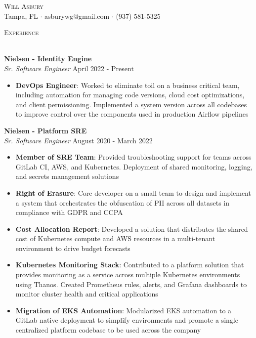 \documentclass[a4paper]{article}
\newcommand{\lineunder} {
    \vspace*{-8pt} \\
    \hspace*{-18pt} \hrulefill \\
}
\newcommand{\header} [1] {
    {\hspace*{-18pt}\vspace*{6pt} \textsc{#1}}
    \vspace*{-6pt} \lineunder
}
\begin{document}
\vspace*{-40pt}

\vspace*{-10pt}
\begin{center}
	{\Huge \scshape {Will Asbury}}\\
	Tampa, FL $\cdot$ asburywg@gmail.com $\cdot$ (937) 581-5325\\
\end{center}

\header{Experience}
\vspace{1mm}

\textbf{Nielsen - Identity Engine}\\
\textit{Sr. Software Engineer} \hfill April 2022 - Present\\
\vspace{-1mm}
\begin{itemize} \itemsep 1pt
    \item \textbf{DevOps Engineer}: Worked to eliminate toil on a business critical team, including automation for managing code versions, cloud cost optimizations, and client permissioning. Implemented a system version across all codebases to improve control over the components used in production Airflow pipelines
\end{itemize}

\textbf{Nielsen - Platform SRE}\\
\textit{Sr. Software Engineer} \hfill August 2020 - March 2022\\
\vspace{-1mm}
\begin{itemize} \itemsep 1pt
    \item \textbf{Member of SRE Team}: Provided troubleshooting support for teams across GitLab CI, AWS, and Kubernetes. Deployment of shared monitoring, logging, and secrets management solutions
    \item \textbf{Right of Erasure}: Core developer on a small team to design and implement a system that orchestrates the obfuscation of PII across all datasets in compliance with GDPR and CCPA
    \item \textbf{Cost Allocation Report}: Developed a solution that distributes the shared cost of Kubernetes compute and AWS resources in a multi-tenant environment to drive budget forecasts
    \item \textbf{Kubernetes Monitoring Stack}: Contributed to a platform solution that provides monitoring as a service across multiple Kubernetes environments using Thanos. Created Prometheus rules, alerts, and Grafana dashboards to monitor cluster health and critical applications
    \item \textbf{Migration of EKS Automation}: Modularized EKS automation to a GitLab native deployment to simplify environments and promote a single centralized platform codebase to be used across the company
\end{itemize}
\end{document}
